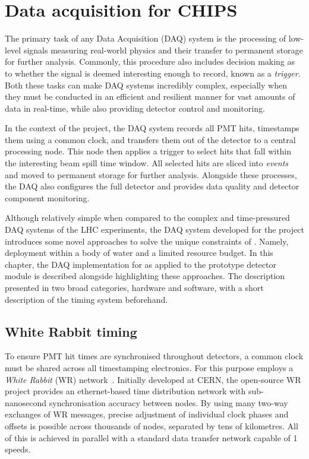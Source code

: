 \chapter{Data acquisition for CHIPS} %
\label{chap:daq} %

The primary task of any Data Acquisition (DAQ) system is the processing of low-level signals
measuring real-world physics and their transfer to permanent storage for further analysis.
Commonly, this procedure also includes decision making as to whether the signal is deemed
interesting enough to record, known as a \emph{trigger}. Both these tasks can make DAQ systems
incredibly complex, especially when they must be conducted in an efficient and resilient manner
for vast amounts of data in real-time, while also providing detector control and monitoring.

In the context of the \chips project, the DAQ system records all PMT hits, timestamps them using a
common clock, and transfers them out of the detector to a central processing node. This node then
applies a trigger to select hits that fall within the interesting beam spill time window. All
selected hits are sliced into \emph{events} and moved to permanent storage for further analysis.
Alongside these processes, the DAQ also configures the full detector and provides data quality and
detector component monitoring.

Although relatively simple when compared to the complex and time-pressured DAQ systems of the LHC
experiments, the DAQ system developed for the \chips project introduces some novel approaches to
solve the unique constraints of \chips. Namely, deployment within a body of water and a limited
resource budget. In this chapter, the DAQ implementation for \chips as applied to the \chipsfive
prototype detector module is described alongside highlighting these approaches. The description
presented in two broad categories, hardware and software, with a short description of the timing
system beforehand.

\section{White Rabbit timing} %
\label{sec:daq_timing} %

To ensure PMT hit times are synchronised throughout \chips detectors, a common clock must be
shared across all timestamping electronics. For this purpose \chips employs a \emph{White Rabbit}
(WR) network~\cite{lipinski2011}. Initially developed at CERN, the open-source WR project provides
an ethernet-based time distribution network with sub-nanosecond synchronisation accuracy between
nodes. By using many two-way exchanges of WR messages, precise adjustment of individual clock
phases and offsets is possible across thousands of nodes, separated by tens of kilometres. All of
this is achieved in parallel with a standard data transfer network capable of
\unit{1}{} speeds.

